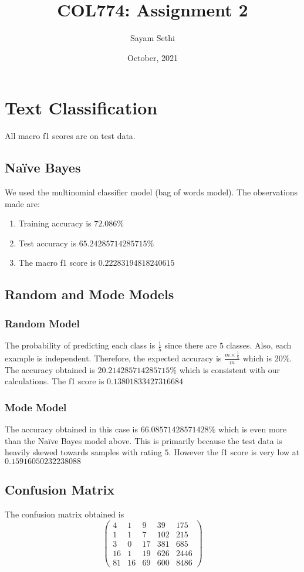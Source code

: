 \documentclass[11pt]{article}
\title{COL774: Assignment 2}
\author{Sayam Sethi}
\date{October, 2021}
\begin{document}
\maketitle

\tableofcontents

\section{Text Classification}

All macro f1 scores are on test data.

\subsection{Na\"{i}ve Bayes}
We used the multinomial classifier model (bag of words model). The observations made are:
\begin{enumerate}
  \item Training accuracy is $72.086\%$
  \item Test accuracy is $65.24285714285715\%$
  \item The macro f1 score is $0.22283194818240615$
\end{enumerate}

\subsection{Random and Mode Models}

\subsubsection{Random Model}
The probability of predicting each class is $\frac{1}{5}$ since there are $5$ classes. Also, each example is independent. Therefore, the expected accuracy is $\frac{m\times\frac{1}{5}}{m}$ which is $20\%$. The accuracy obtained is $20.214285714285715\%$ which is consistent with our calculations. The f1 score is $0.13801833427316684$

\subsubsection{Mode Model}
The accuracy obtained in this case is $66.08571428571428\%$ which is even more than the Na\"{i}ve Bayes model above. This is primarily because the test data is heavily skewed towards samples with rating $5$. However the f1 score is very low at $0.15916050232238088$

\subsection{Confusion Matrix}
The confusion matrix obtained is
\begin{equation}
  \begin{pmatrix}
    4 & 1 & 9 & 39 & 175\\
    1 & 1 & 7 & 102 & 215\\
    3 & 0 & 17 & 381 & 685\\
    16 & 1 & 19 & 626 & 2446\\
    81 & 16 & 69 & 600 & 8486
  \end{pmatrix}
\end{equation}
\end{document}
